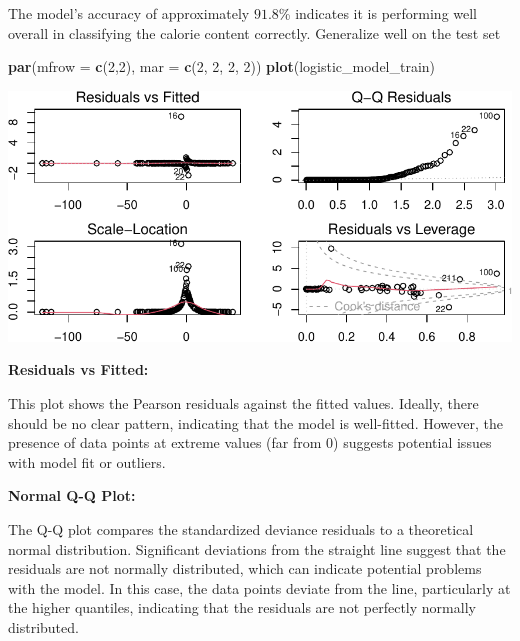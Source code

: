 \documentclass[
]{article}
\newenvironment{Shaded}{\begin{snugshade}}{\end{snugshade}}
\newcommand{\AttributeTok}[1]{\textcolor[rgb]{0.13,0.29,0.53}{#1}}
\newcommand{\DecValTok}[1]{\textcolor[rgb]{0.00,0.00,0.81}{#1}}
\newcommand{\FunctionTok}[1]{\textcolor[rgb]{0.13,0.29,0.53}{\textbf{#1}}}
\newcommand{\NormalTok}[1]{#1}
\begin{document}
The model's accuracy of approximately \(91.8\)\% indicates it is
performing well overall in classifying the calorie content correctly.
Generalize well on the test set

\begin{Shaded}
\begin{Highlighting}[]
\FunctionTok{par}\NormalTok{(}\AttributeTok{mfrow =} \FunctionTok{c}\NormalTok{(}\DecValTok{2}\NormalTok{,}\DecValTok{2}\NormalTok{), }\AttributeTok{mar =} \FunctionTok{c}\NormalTok{(}\DecValTok{2}\NormalTok{, }\DecValTok{2}\NormalTok{, }\DecValTok{2}\NormalTok{, }\DecValTok{2}\NormalTok{))}
\FunctionTok{plot}\NormalTok{(logistic\_model\_train)}
\end{Highlighting}
\end{Shaded}

\begin{center}\includegraphics{Statistical_Learning_Final_Report_files/figure-latex/logistic_regression_evaluation_2-1} \end{center}

\textbf{Residuals vs Fitted:}

This plot shows the Pearson residuals against the fitted values.
Ideally, there should be no clear pattern, indicating that the model is
well-fitted. However, the presence of data points at extreme values (far
from \(0\)) suggests potential issues with model fit or outliers.

\textbf{Normal Q-Q Plot:}

The Q-Q plot compares the standardized deviance residuals to a
theoretical normal distribution. Significant deviations from the
straight line suggest that the residuals are not normally distributed,
which can indicate potential problems with the model. In this case, the
data points deviate from the line, particularly at the higher quantiles,
indicating that the residuals are not perfectly normally distributed.
\end{document}
